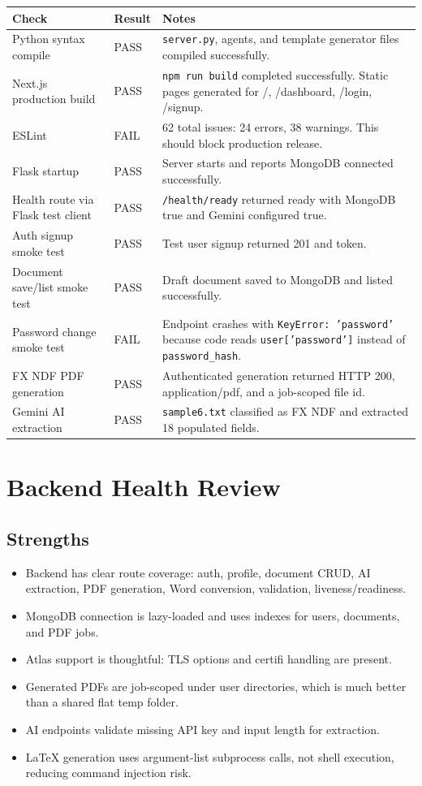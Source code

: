 \documentclass[11pt]{article}
\begin{document}
\begin{longtable}{|p{}|p{}|p{}|}
\hline
\textbf{Check} & \textbf{Result} & \textbf{Notes} \\
\hline
Python syntax compile & PASS & \texttt{server.py}, agents, and template generator files compiled successfully. \\
\hline
Next.js production build & PASS & \texttt{npm run build} completed successfully. Static pages generated for /, /dashboard, /login, /signup. \\
\hline
ESLint & FAIL & 62 total issues: 24 errors, 38 warnings. This should block production release. \\
\hline
Flask startup & PASS & Server starts and reports MongoDB connected successfully. \\
\hline
Health route via Flask test client & PASS & \texttt{/health/ready} returned ready with MongoDB true and Gemini configured true. \\
\hline
Auth signup smoke test & PASS & Test user signup returned 201 and token. \\
\hline
Document save/list smoke test & PASS & Draft document saved to MongoDB and listed successfully. \\
\hline
Password change smoke test & FAIL & Endpoint crashes with \texttt{KeyError: 'password'} because code reads \texttt{user['password']} instead of \texttt{password\_hash}. \\
\hline
FX NDF PDF generation & PASS & Authenticated generation returned HTTP 200, application/pdf, and a job-scoped file id. \\
\hline
Gemini AI extraction & PASS & \texttt{sample6.txt} classified as FX NDF and extracted 18 populated fields. \\
\hline
\end{longtable}

\section{Backend Health Review}

\subsection{Strengths}
\begin{itemize}
  \item Backend has clear route coverage: auth, profile, document CRUD, AI extraction, PDF generation, Word conversion, validation, liveness/readiness.
  \item MongoDB connection is lazy-loaded and uses indexes for users, documents, and PDF jobs.
  \item Atlas support is thoughtful: TLS options and certifi handling are present.
  \item Generated PDFs are job-scoped under user directories, which is much better than a shared flat temp folder.
  \item AI endpoints validate missing API key and input length for extraction.
  \item LaTeX generation uses argument-list subprocess calls, not shell execution, reducing command injection risk.
\end{itemize}
\end{document}
